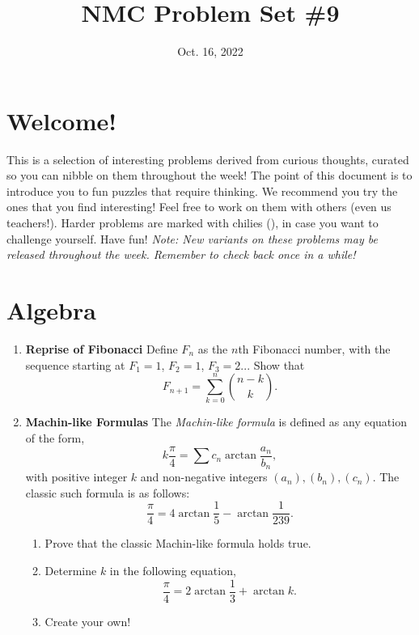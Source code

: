 \documentclass[11pt]{scrartcl}
\begin{document}
\title{NMC Problem Set \#9} %
\date{Oct. 16, 2022} %
\maketitle

\section*{Welcome!}

This is a selection of interesting problems derived from curious thoughts, curated so you can nibble on them throughout the week! The point of this document is to introduce you to fun puzzles that require thinking. We recommend you try the ones that you find interesting! Feel free to work on them with others (even us teachers!). Harder problems are marked with chilies (\fullchili), in case you want to challenge yourself.
\newline\newline
Have fun! \textit{Note: New variants on these problems may be released throughout the week. Remember to check back once in a while!}
    
\section{Algebra}
\begin{enumerate}[label=\textbf{A\arabic*}.]
    \item \textbf{Reprise of Fibonacci} \newline
    Define $F_{n}$ as the $n$th Fibonacci number, with the sequence starting at $F_1 = 1$, $F_2 = 1$, $F_3 = 2$... Show that
    \[ F_{n+1} = \sum_{k=0}^n \binom{n-k}{k}. \]
    
    \item \textbf{Machin-like Formulas} \newline
    The \textit{Machin-like formula} is defined as any equation of the form,
    \[ k\frac{\pi}{4} = \sum c_n \arctan \frac{a_n}{b_n}, \]
    with positive integer $k$ and non-negative integers $(a_n), (b_n), (c_n)$. The classic such formula is as follows:
    \[ \frac{\pi}{4} = 4\arctan\frac{1}{5} - \arctan\frac{1}{239}. \]
    
    \begin{enumerate}
        \item Prove that the classic Machin-like formula holds true.
        
        \item Determine $k$ in the following equation,
        \[ \frac{\pi}{4} = 2 \arctan \frac{1}{3} + \arctan k.  \]
        
        \item Create your own!
    \end{enumerate}
    
    
\end{enumerate}
\end{document}
